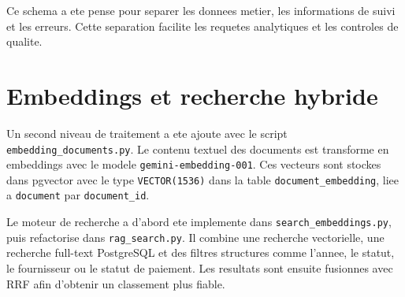 Ce schema a ete pense pour separer les donnees metier, les informations de suivi et les erreurs. Cette separation facilite les requetes analytiques et les controles de qualite.

\section{Embeddings et recherche hybride}

Un second niveau de traitement a ete ajoute avec le script \texttt{embedding\_documents.py}. Le contenu textuel des documents est transforme en embeddings avec le modele \texttt{gemini-embedding-001}. Ces vecteurs sont stockes dans pgvector avec le type \texttt{VECTOR(1536)} dans la table \texttt{document\_embedding}, liee a \texttt{document} par \texttt{document\_id}.

Le moteur de recherche a d'abord ete implemente dans \texttt{search\_embeddings.py}, puis refactorise dans \texttt{rag\_search.py}. Il combine une recherche vectorielle, une recherche full-text PostgreSQL et des filtres structures comme l'annee, le statut, le fournisseur ou le statut de paiement. Les resultats sont ensuite fusionnes avec RRF afin d'obtenir un classement plus fiable.
